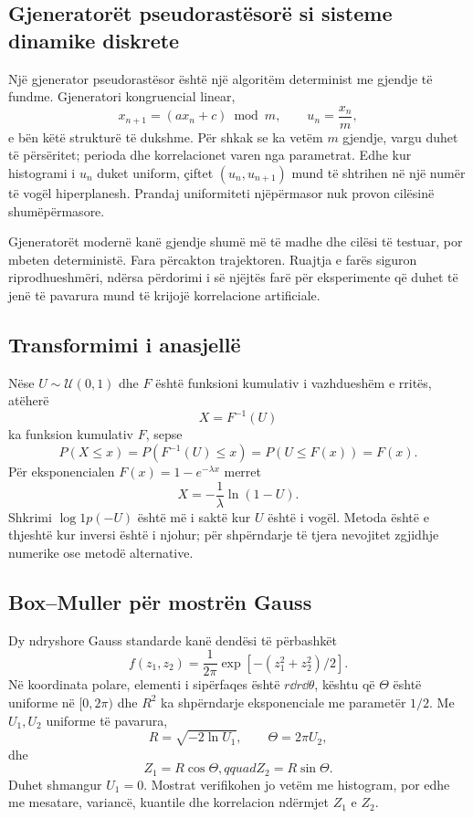 \subsection{Gjeneratorët pseudorastësorë si sisteme dinamike diskrete}
Një gjenerator pseudorastësor është një algoritëm determinist me gjendje të fundme. Gjeneratori kongruencial linear,
\begin{equation}
 x_{n+1}=(ax_n+c)\bmod m,
 \qquad u_n=\frac{x_n}{m},
\end{equation}
e bën këtë strukturë të dukshme. Për shkak se ka vetëm $m$ gjendje, vargu duhet të përsëritet; perioda dhe korrelacionet varen nga parametrat. Edhe kur histogrami i $u_n$ duket uniform, çiftet $(u_n,u_{n+1})$ mund të shtrihen në një numër të vogël hiperplanesh. Prandaj uniformiteti njëpërmasor nuk provon cilësinë shumëpërmasore.

Gjeneratorët modernë kanë gjendje shumë më të madhe dhe cilësi të testuar, por mbeten deterministë. Fara përcakton trajektoren. Ruajtja e farës siguron riprodhueshmëri, ndërsa përdorimi i së njëjtës farë për eksperimente që duhet të jenë të pavarura mund të krijojë korrelacione artificiale.

\subsection{Transformimi i anasjellë}
Nëse $U\sim\mathcal U(0,1)$ dhe $F$ është funksioni kumulativ i vazhdueshëm e rritës, atëherë
\begin{equation}
 X=F^{-1}(U)
\end{equation}
ka funksion kumulativ $F$, sepse
\begin{equation}
 P(X\le x)=P(F^{-1}(U)\le x)=P(U\le F(x))=F(x).
\end{equation}
Për eksponencialen $F(x)=1-e^{-\lambda x}$ merret
\begin{equation}
 X=-\frac{1}{\lambda}\ln(1-U).
\end{equation}
Shkrimi $\log1p(-U)$ është më i saktë kur $U$ është i vogël. Metoda është e thjeshtë kur inversi është i njohur; për shpërndarje të tjera nevojitet zgjidhje numerike ose metodë alternative.

\subsection{Box--Muller për mostrën Gauss}
Dy ndryshore Gauss standarde kanë dendësi të përbashkët
\begin{equation}
 f(z_1,z_2)=\frac{1}{2\pi}\exp[-(z_1^2+z_2^2)/2].
\end{equation}
Në koordinata polare, elementi i sipërfaqes është $r\dd r\dd\theta$, kështu që $\Theta$ është uniforme në $[0,2\pi)$ dhe $R^2$ ka shpërndarje eksponenciale me parametër $1/2$. Me $U_1,U_2$ uniforme të pavarura,
\begin{equation}
 R=\sqrt{-2\ln U_1},\qquad \Theta=2\pi U_2,
\end{equation}
dhe
\begin{equation}
 Z_1=R\cos\Theta,qquad Z_2=R\sin\Theta.
\end{equation}
Duhet shmangur $U_1=0$. Mostrat verifikohen jo vetëm me histogram, por edhe me mesatare, variancë, kuantile dhe korrelacion ndërmjet $Z_1$ e $Z_2$.

